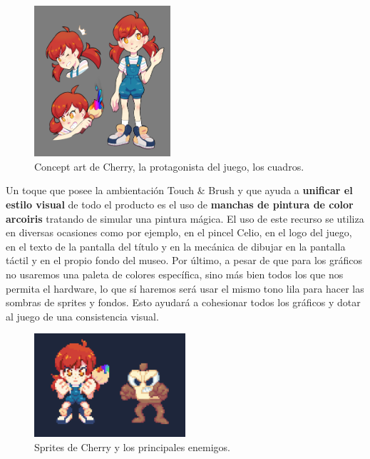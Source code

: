 \begin{figure}[htbp]
\centering
  \includegraphics[width=0.45\textwidth]{archivos/cherry.png}
  \caption{Concept art de Cherry, la protagonista del juego, los cuadros.}
  \label{fig:cherry}
\end{figure}

\vspace{0.5cm}

Un toque que posee la ambientación Touch \& Brush y que ayuda a \textbf{unificar el estilo visual} de todo el producto es el uso de \textbf{manchas de pintura de color arcoiris} tratando de simular una pintura mágica. El uso de este recurso se utiliza en diversas ocasiones como por ejemplo, en el pincel Celio, en el logo del juego, en el texto de la pantalla del título y en la mecánica de dibujar en la pantalla táctil y en el propio fondo del museo. Por último, a pesar de que para los gráficos no usaremos una paleta de colores específica, sino más bien todos los que nos permita el hardware, lo que sí haremos será usar el mismo tono lila para hacer las sombras de sprites y fondos. Esto ayudará a cohesionar todos los gráficos y dotar al juego de una consistencia visual.

\vspace{0.5cm}

\begin{figure}[htbp]
\centering
  \includegraphics[width=0.5\textwidth]{archivos/sprites.png}
  \caption{Sprites de Cherry y los principales enemigos.}
  \label{fig:sprites_gdd}
\end{figure}

